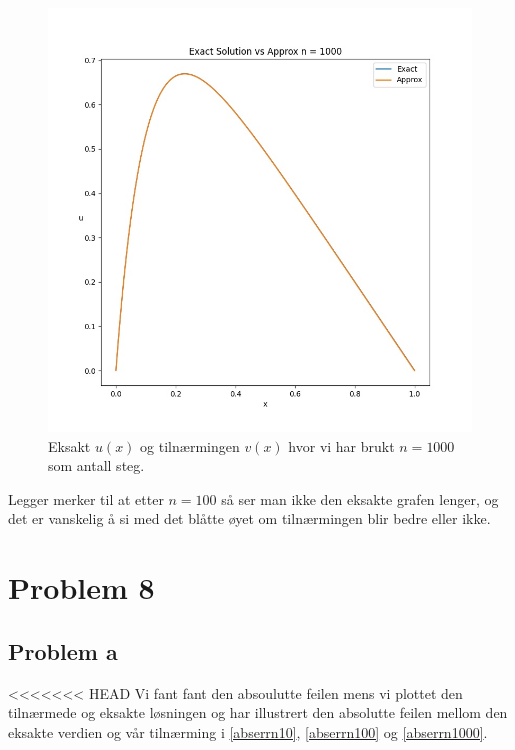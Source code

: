 \documentclass[english,notitlepage]{revtex4-1}  %
\begin{document}
\begin{figure}[h]
\centering
\includegraphics[scale=0.60]{Images/problem7NEW1000.jpg}
\caption{Eksakt $u(x)$ og tilnærmingen $v(x)$ hvor vi har brukt $n = 1000$ som antall steg.}
\label{7n1000}
\end{figure}

Legger merker til at etter $n = 100$ så ser man ikke den eksakte grafen lenger, og det er vanskelig å si med det blåtte øyet om tilnærmingen blir bedre eller ikke.


\section*{Problem 8}

\subsection*{Problem a}
<<<<<<< HEAD
Vi fant fant den absoulutte feilen mens vi plottet den tilnærmede og eksakte løsningen og har illustrert den absolutte feilen mellom den eksakte verdien og vår tilnærming i \ref{abserrn10}, \ref{abserrn100} og \ref{abserrn1000}.
\end{document}
